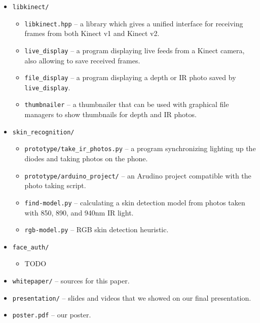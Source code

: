     \begin{itemize}
        \item \texttt{libkinect/}
        \begin{itemize}
            \item \texttt{libkinect.hpp} -- a library which gives a unified interface
            for receiving frames from both Kinect v1 and Kinect v2.
            \item \texttt{live\_display} -- a program displaying live feeds from a Kinect
            camera, also allowing to save received frames.
            \item \texttt{file\_display} -- a program displaying a depth or IR photo saved
            by \texttt{live\_display}.
            \item \texttt{thumbnailer} -- a thumbnailer that can be used with graphical
            file managers to show thumbnails for depth and IR photos.
        \end{itemize}
        \item \texttt{skin\_recognition/}
        \begin{itemize}
            \item \texttt{prototype/take\_ir\_photos.py} -- a program synchronizing
            lighting up the diodes and taking photos on the phone.
            \item \texttt{prototype/arduino\_project/} -- an Arudino project
            compatible with the photo taking script.
            \item \texttt{find-model.py} -- calculating a skin detection model from
            photos taken with 850, 890, and 940nm IR light.
            \item \texttt{rgb-model.py} -- RGB skin detection heuristic.
        \end{itemize}
        \item \texttt{face\_auth/}
        \begin{itemize}
            \item TODO
        \end{itemize}
        \item \texttt{whitepaper/} -- sources for this paper.
        \item \texttt{presentation/} -- slides and videos that we showed on our
        final presentation.
        \item \texttt{poster.pdf} -- our poster.
    \end{itemize}
